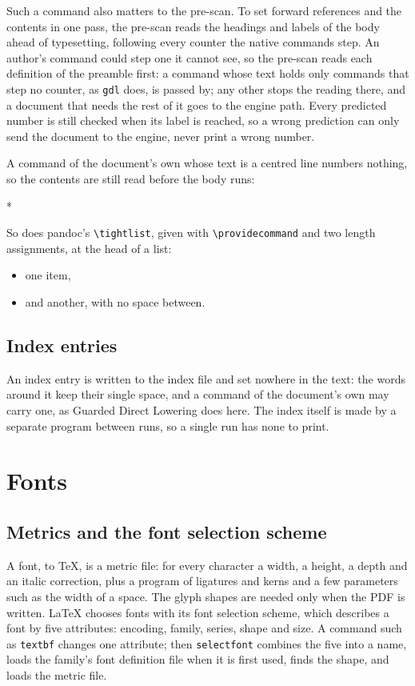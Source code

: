\documentclass{article}
\numberwithin{equation}{section}
\newcommand{\gdl}{Guarded Direct Lowering}
\newcommand{\rtscenebreak}{\begin{center}*\quad *\quad *\end{center}}
\providecommand{\tightlist}{%
  \setlength{\itemsep}{0pt}\setlength{\parskip}{0pt}}
\theoremstyle{definition}
\theoremstyle{remark}
\begin{document}
Such a command also matters to the pre-scan. To set forward references and the contents
in one pass, the pre-scan reads the headings and labels of the body ahead of
typesetting, following every counter the native commands step. An author's command could
step one it cannot see, so the pre-scan reads each definition of the preamble first: a
command whose text holds only commands that step no counter, as \texttt{gdl} does, is
passed by; any other stops the reading there, and a document that needs the rest of it
goes to the engine path. Every predicted number is still checked when its label is
reached, so a wrong prediction can only send the document to the engine, never print a
wrong number.

A command of the document's own whose text is a centred line numbers nothing, so the
contents are still read before the body runs:
\rtscenebreak
So does pandoc's \verb|\tightlist|, given with \verb|\providecommand| and two length
assignments, at the head of a list:
\begin{itemize}
\tightlist
\item one item,
\item and another, with no space between.
\end{itemize}

\subsection{Index entries}\label{sec:index}
An index entry is written to the index file and set
nowhere in the text: the words around it keep their single space, and a
command of the document's own may carry one, as \gdl{} does here. The index
itself is made by a separate program between runs, so a single run has none to print.

\section{Fonts}\label{sec:fonts}

\subsection{Metrics and the font selection scheme}

A font, to \TeX, is a metric file: for every character a width, a height, a depth and an
italic correction, plus a program of ligatures and kerns and a few parameters such as
the width of a space. The glyph shapes are needed only when the PDF is written. \LaTeX{}
chooses fonts with its font selection scheme, which describes a font by five
attributes: encoding, family, series, shape and size. A command such as
\texttt{textbf} changes one attribute; then \texttt{selectfont} combines the five into
a name, loads the family's font definition file when it is first used, finds the shape,
and loads the metric file.
\end{document}
